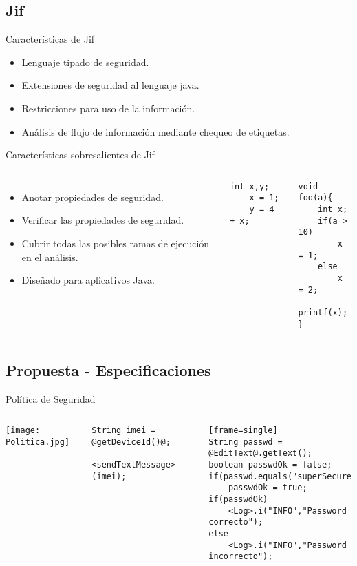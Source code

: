 \subsection{Jif}
\begin{frame}{Características de Jif}
\begin{itemize}
  \item Lenguaje tipado de seguridad.
  \item Extensiones de seguridad al lenguaje java.
  \item Restricciones para uso de la información.
  \item Análisis de flujo de información mediante chequeo de etiquetas.
\end{itemize}
\end{frame}
\begin{frame}[fragile]{Características sobresalientes de Jif}
\begin{columns}[T]
\column{2in}
	\begin{itemize}
	  \item Anotar propiedades de seguridad.
	  \item Verificar las propiedades de seguridad.
	  \item Cubrir todas las posibles ramas de ejecución en el análisis.
	  \item Diseñado para aplicativos Java.
	\end{itemize}
\begin{lstlisting}[style=base]
	int x,y;
	x = 1;	
	y = 4 + x;
\end{lstlisting}
\begin{lstlisting}[style=base]
void foo(a){
	int x;
	if(a > 10)
		x = 1;
	else
		x = 2;
	printf(x);
}
\end{lstlisting}
\end{columns}

\end{frame}

\subsection{Propuesta - Especificaciones}
\begin{frame}[fragile]{Política de Seguridad}
\begin{columns}[T]
\column{1.5in}
	\texttt{[image: Politica.jpg]} 
	\pause
\column{2.5in}
\begin{lstlisting}[style=base]
	String imei = @getDeviceId()@;
	<sendTextMessage>(imei);
\end{lstlisting}
\pause
\begin{lstlisting}[style=base][frame=single]
String passwd = @EditText@.getText();
boolean passwdOk = false;
if(passwd.equals("superSecure"))
	passwdOk = true;
if(passwdOk)
	<Log>.i("INFO","Password correcto");
else
	<Log>.i("INFO","Password incorrecto");
\end{lstlisting}
\end{columns}

\end{frame}

